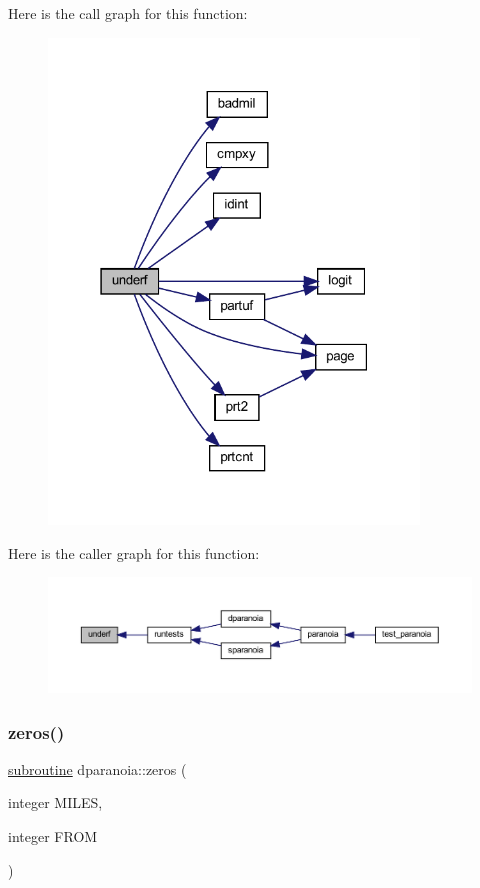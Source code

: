 Here is the call graph for this function\+:
\nopagebreak
\begin{figure}[H]
\begin{center}
\leavevmode
\includegraphics[width=279pt]{dparanoia_8f90_aa99be2fbd962a1d98b5066c736157b46_cgraph}
\end{center}
\end{figure}
Here is the caller graph for this function\+:
\nopagebreak
\begin{figure}[H]
\begin{center}
\leavevmode
\includegraphics[width=350pt]{dparanoia_8f90_aa99be2fbd962a1d98b5066c736157b46_icgraph}
\end{center}
\end{figure}
\mbox{\label{dparanoia_8f90_aa950201dedb2112e97b67e9fae35f88e}} 
\subsubsection{\texorpdfstring{zeros()}{zeros()}}
{\footnotesize\ttfamily \hyperlink{M__stopwatch_83_8txt_acfbcff50169d691ff02d4a123ed70482}{subroutine} dparanoia\+::zeros (\begin{DoxyParamCaption}\item[{integer}]{M\+I\+L\+ES,  }\item[{integer}]{F\+R\+OM }\end{DoxyParamCaption})}



